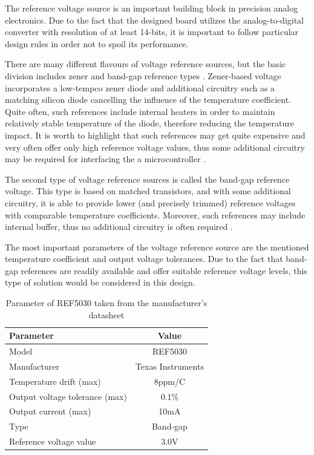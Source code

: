 \documentclass[12pt,a4paper]{article}
\begin{document}
The reference voltage source is an important building block in precision analog electronics. Due to the fact that the designed board utilizes the analog-to-digital converter with resolution of at least 14-bits, it is important to follow particular design rules in order not to spoil its performance.
\par

There are many different flavours of voltage reference sources, but the basic division includes zener and band-gap reference types \cite{companion}. Zener-based voltage incorporates a low-tempco zener diode and additional circuitry such as a matching silicon diode cancelling the influence of the temperature coefficient. Quite often, such references include internal heaters in order to maintain relatively stable temperature of the diode, therefore reducing the temperature impact. It is worth to highlight that such references may get quite expensive and very often offer only high reference voltage values, thus some additional circuitry may be required for interfacing the a microcontroller \cite{companion}.
\par

The second type of voltage reference sources is called the band-gap reference voltage. This type is based on matched transistors, and with some additional circuitry, it is able to provide lower (and precisely trimmed) reference voltages with comparable temperature coefficients. Moreover, such references may include internal buffer, thus no additional circuitry is often required \cite{companion}.
\par

The most important parameters of the voltage reference source are the mentioned temperature coefficient and output voltage tolerances. Due to the fact that band-gap references   are readily available and offer suitable reference voltage levels, this type of solution would be considered in this design.\par

\begin{table}[ht!]
\begin{tabular}{|l|c|}
\hline
\textbf{Parameter}	& \textbf{Value} 	\\ \hline
Model  				& REF5030       \\ \hline
Manufacturer    	& Texas Instruments	\\ \hline
Temperature drift (max)       	&  8ppm/\degree C 	\\\hline
Output voltage tolerance (max)     &  0.1\%			\\ \hline
Output current (max)       & 10mA\\ \hline
Type         &  Band-gap				\\ \hline
Reference voltage value		&  3.0V		\\ \hline

\end{tabular}
\caption{Parameter of REF5030 taken from the manufacturer's datasheet \cite{ref5030_params}}
\label{tab:fer5030_params}
\end{table}
\end{document}
